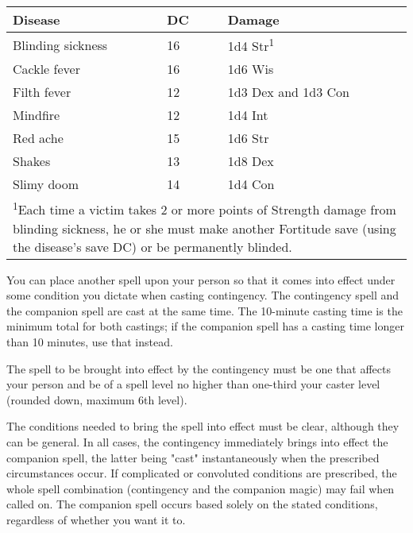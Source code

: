 \begin{multicols}{2}
\begin{small}
\begin{center}
\begin{tabular}[h!]{l|l|l}
Disease & DC & Damage \\ \hline
Blinding sickness & 16 & 1d4 Str\textsuperscript{1} \\
Cackle fever & 16 & 1d6 Wis \\
Filth fever & 12 & 1d3 Dex and 1d3 Con \\
Mindfire & 12 & 1d4 Int \\
Red ache & 15 & 1d6 Str	\\
Shakes & 13 & 1d8 Dex \\
Slimy doom & 14 & 1d4 Con \\
\multicolumn{3}{p{3in}}{\textsuperscript{1}Each time a victim takes 2 or more points of Strength damage from blinding sickness, he or she must make another Fortitude save (using the disease's save DC) or be permanently blinded.} \\
\end{tabular}
\end{center}

\noindent You can place another spell upon your person so that it comes into effect under some condition you dictate when casting contingency. The contingency spell and the companion spell are cast at the same time. The 10-minute casting time is the minimum total for both castings; if the companion spell has a casting time longer than 10 minutes, use that instead.

\smallskip\noindent The spell to be brought into effect by the contingency must be one that affects your person and be of a spell level no higher than one-third your caster level (rounded down, maximum 6th level).

\smallskip\noindent The conditions needed to bring the spell into effect must be clear, although they can be general. In all cases, the contingency immediately brings into effect the companion spell, the latter being "cast" instantaneously when the prescribed circumstances occur. If complicated or convoluted conditions are prescribed, the whole spell combination (contingency and the companion magic) may fail when called on. The companion spell occurs based solely on the stated conditions, regardless of whether you want it to. 


\end{small}
\end{multicols}
